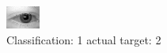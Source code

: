 \begin{figure}[h!]
\begin{center}
\includegraphics[width=0.60\columnwidth]{figures/ID396_class_1_target_2.png}
\end{center}
\caption{ Classification: 1 actual target: 2}
\label{fig:ID396_class_1_target_2}
\end{figure}
